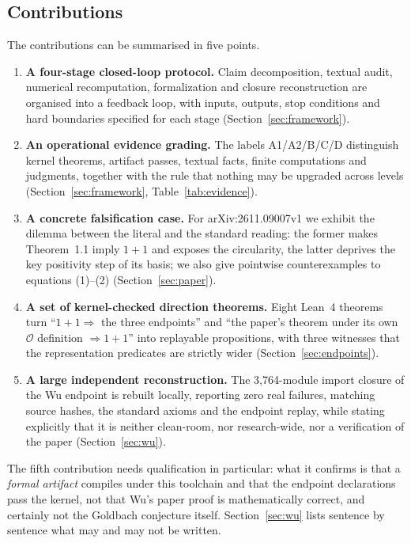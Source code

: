 \documentclass[11pt,a4paper]{article}
\theoremstyle{plain}
\theoremstyle{definition}
\begin{document}
\subsection{Contributions}
\label{sec:contributions}

The contributions can be summarised in five points.

\begin{enumerate}
\item \textbf{A four-stage closed-loop protocol.} Claim decomposition, textual audit, numerical recomputation, formalization and closure reconstruction are organised into a feedback loop, with inputs, outputs, stop conditions and hard boundaries specified for each stage (Section~\ref{sec:framework}).
\item \textbf{An operational evidence grading.} The labels A1/A2/B/C/D distinguish kernel theorems, artifact passes, textual facts, finite computations and judgments, together with the rule that nothing may be upgraded across levels (Section~\ref{sec:framework}, Table~\ref{tab:evidence}).
\item \textbf{A concrete falsification case.} For arXiv:2611.09007v1 we exhibit the dilemma between the literal and the standard reading: the former makes Theorem~1.1 imply $1+1$ and exposes the circularity, the latter deprives the key positivity step of its basis; we also give pointwise counterexamples to equations (1)--(2) (Section~\ref{sec:paper}).
\item \textbf{A set of kernel-checked direction theorems.} Eight Lean~4 theorems turn ``$1+1\Rightarrow$ the three endpoints'' and ``the paper's theorem under its own $\mathcal O$ definition $\Rightarrow 1+1$'' into replayable propositions, with three witnesses that the representation predicates are strictly wider (Section~\ref{sec:endpoints}).
\item \textbf{A large independent reconstruction.} The 3,764-module import closure of the Wu endpoint is rebuilt locally, reporting zero real failures, matching source hashes, the standard axioms and the endpoint replay, while stating explicitly that it is neither clean-room, nor research-wide, nor a verification of the paper (Section~\ref{sec:wu}).
\end{enumerate}

The fifth contribution needs qualification in particular: what it confirms is that a \emph{formal artifact} compiles under this toolchain and that the endpoint declarations pass the kernel, not that Wu's paper proof is mathematically correct, and certainly not the Goldbach conjecture itself. Section~\ref{sec:wu} lists sentence by sentence what may and may not be written.
\end{document}
